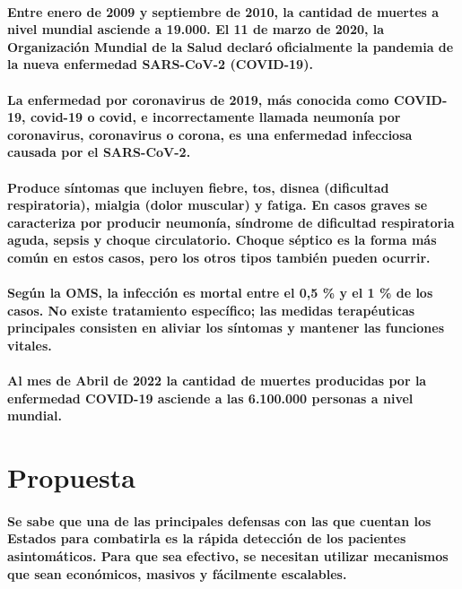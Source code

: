 \documentclass[a4paper,12pt]{article}
\begin{document}
\paragraph{Entre enero de 2009 y septiembre de 2010, la cantidad de muertes a nivel mundial asciende a 19.000.
El 11 de marzo de 2020, la Organización Mundial de la Salud declaró oficialmente la pandemia de la nueva enfermedad SARS-CoV-2 (COVID-19).}
\paragraph{La enfermedad por coronavirus de 2019, más conocida como COVID-19, covid-19 o covid, e incorrectamente llamada neumonía por coronavirus, coronavirus o corona, es una enfermedad infecciosa causada por el SARS-CoV-2.}
\paragraph{Produce síntomas que incluyen fiebre, tos, disnea (dificultad respiratoria), mialgia (dolor muscular) y fatiga. En casos graves se caracteriza por producir neumonía, síndrome de dificultad respiratoria aguda, sepsis y choque circulatorio. Choque séptico es la forma más común en estos casos, pero los otros tipos también pueden ocurrir.}
\paragraph{Según la OMS, la infección es mortal entre el 0,5 \% y el 1 \% de los casos. No existe tratamiento específico; las medidas terapéuticas principales consisten en aliviar los síntomas y mantener las funciones vitales.}
\paragraph{Al mes de Abril de 2022 la cantidad de muertes producidas por la enfermedad COVID-19 asciende a las 6.100.000 personas a nivel mundial.}
\section{Propuesta}
\paragraph{Se sabe que una de las principales defensas con las que cuentan los Estados para combatirla es la rápida detección de los pacientes asintomáticos. Para que sea efectivo, se necesitan utilizar mecanismos que sean económicos, masivos y fácilmente escalables.}
\end{document}
